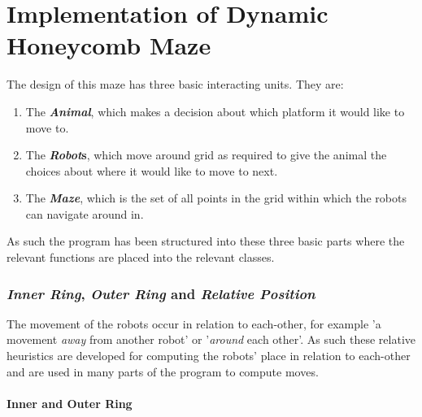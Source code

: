 \section{Implementation of Dynamic Honeycomb Maze}

The design of this maze has three basic interacting units.
They are:
\begin{enumerate}
    \item The \textbf{\textit{Animal}}, which makes a decision about which platform it would like to move to.
    \item The \textbf{\textit{Robot}s}, which  move around grid as required to give the animal the choices about where it would like to move to next.
    \item The \textbf{\textit{Maze}}, which is the set of all points in the grid within which the robots can navigate around in.
\end{enumerate}
As such the program has been structured into these three basic parts where the relevant functions are placed into the relevant classes.

\subsubsection{\textit{Inner Ring}, \textit{Outer Ring} and \textit{Relative Position}}




The movement of the robots occur in relation to each-other, for example 'a movement \textit{away} from another robot' or '\textit{around} each other'. As such  these relative heuristics are developed for computing the robots' place in relation to each-other and are used in many parts of the program to compute moves.

\paragraph{Inner and Outer Ring}


